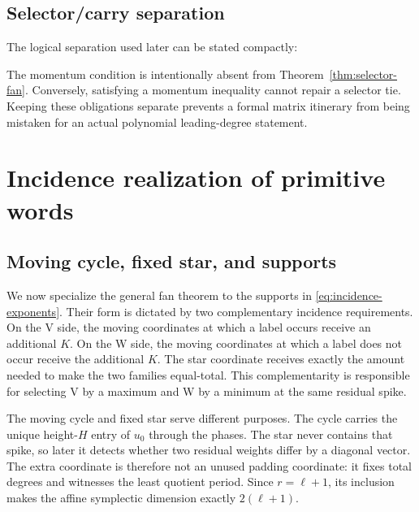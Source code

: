 \documentclass[11pt,letterpaper]{article}
\theoremstyle{definition}
\theoremstyle{remark}
\numberwithin{equation}{section}
\begin{document}
\subsection{Selector/carry separation}

The logical separation used later can be stated compactly:

\noindent{}

The momentum condition is intentionally absent from
Theorem~\ref{thm:selector-fan}.  Conversely, satisfying a momentum
inequality cannot repair a selector tie.  Keeping these obligations separate
prevents a formal matrix itinerary from being mistaken for an actual
polynomial leading-degree statement.

\section{Incidence realization of primitive words}

\subsection{Moving cycle, fixed star, and supports}

We now specialize the general fan theorem to the supports in
\eqref{eq:incidence-exponents}.  Their form is dictated by two complementary
incidence requirements.  On the V side, the moving coordinates at which a
label occurs receive an additional \(K\).  On the W side, the moving
coordinates at which a label does not occur receive the additional \(K\).
The star coordinate receives exactly the amount needed to make the two
families equal-total.  This complementarity is responsible for selecting V
by a maximum and W by a minimum at the same residual spike.

The moving cycle and fixed star serve different purposes.  The cycle carries
the unique height-\(H\) entry of \(u_0\) through the phases.  The star never
contains that spike, so later it detects whether two residual weights differ
by a diagonal vector.  The extra coordinate is therefore not an unused
padding coordinate: it fixes total degrees and witnesses the least quotient
period.  Since \(r=\ell+1\), its inclusion makes the affine symplectic
dimension exactly \(2(\ell+1)\).
\end{document}
